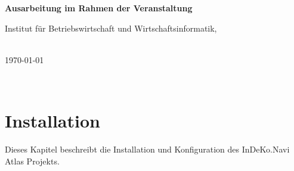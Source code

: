 \begin{titlepage}
\begin{figure}
\begin{minipage}{0.2\textwidth}
\begin{flushleft}
        \end{flushleft}
    \end{minipage} 
    \vspace{4cm}
\end{figure}
\begin{center}
    
    \Huge{\textbf{\titel}}
    
    \Huge{\textbf{\untertitel}}
    \vspace{2cm}
\end{center}
\begin{center}
    \vspace*{0cm}
    \textbf{Ausarbeitung im Rahmen der Veranstaltung \veranstaltung}
    \vspace{1cm}
\end{center}
\begin{center}
    Institut für Betriebswirtschaft und Wirtschaftsinformatik,
    
    \arbeitsgruppe
\end{center}
\begin{center}
    \vspace{5cm}
    \autor\\
    
    
    \today
\end{center}
\end{titlepage}
\newpage


\tableofcontents 

\newpage
\listoffigures
\thispagestyle{empty} 


\newpage
\restoregeometry
{}




\section{Installation}
Dieses Kapitel beschreibt die Installation und Konfiguration des InDeKo.Navi Atlas Projekts.


